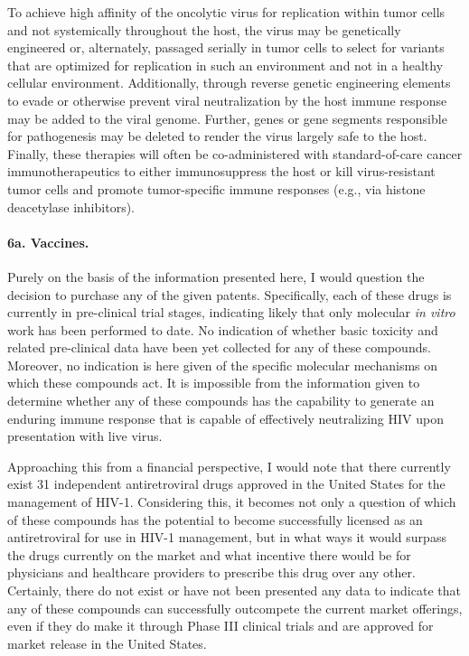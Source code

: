 \documentclass[11pt,letterpaper,final] {article}
\begin{document}
To achieve high affinity of the oncolytic virus for replication within tumor cells and not systemically throughout the host, the virus may be genetically engineered or, alternately, passaged serially in tumor cells to select for variants that are optimized for replication in such an environment and not in a healthy cellular environment. Additionally, through reverse genetic engineering elements to evade or otherwise prevent viral neutralization by the host immune response may be added to the viral genome. Further, genes or gene segments responsible for pathogenesis may be deleted to render the virus largely safe to the host. Finally, these therapies will often be co-administered with standard-of-care cancer immunotherapeutics to either immunosuppress the host or kill virus-resistant tumor cells and promote tumor-specific immune responses (e.g., via histone deacetylase inhibitors).

\paragraph{6a. Vaccines.} Purely on the basis of the information presented here, I would question the decision to purchase any of the given patents. Specifically, each of these drugs is currently in pre-clinical trial stages, indicating likely that only molecular \textit{in vitro} work has been performed to date. No indication of whether basic toxicity and related pre-clinical data have been yet collected for any of these compounds. Moreover, no indication is here given of the specific molecular mechanisms on which these compounds act. It is impossible from the information given to determine whether any of these compounds has the capability to generate an enduring immune response that is capable of effectively neutralizing HIV upon presentation with live virus.

Approaching this from a financial perspective, I would note that there currently exist 31 independent antiretroviral drugs approved in the United States for the management of HIV-1. Considering this, it becomes not only a question of which of these compounds has the potential to become successfully licensed as an antiretroviral for use in HIV-1 management, but in what ways it would surpass the drugs currently on the market and what incentive there would be for physicians and healthcare providers to prescribe this drug over any other. Certainly, there do not exist or have not been presented any data to indicate that any of these compounds can successfully outcompete the current market offerings, even if they do make it through Phase III clinical trials and are approved for market release in the United States.
\end{document}
